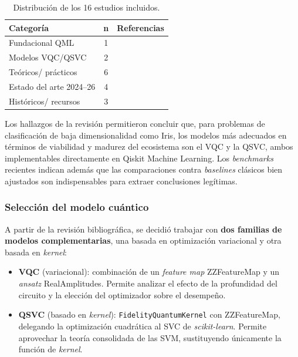 \documentclass[a4paper,10pt,twocolumn]{article}
\begin{document}
\begin{table}[H]
\centering
\caption{Distribuci\'on de los 16 estudios incluidos.}
\label{tab:prisma}
\footnotesize
\begin{tabular}{@{}p{2.6cm}c p{3.7cm}@{}}
\toprule
\textbf{Categor\'ia} & \textbf{n} & \textbf{Referencias} \\
\midrule
Fundacional QML        & 1 & \cite{biamonte2017} \\
Modelos VQC/QSVC       & 2 & \cite{havlicek2019,rebentrost2014} \\
Te\'oricos/ pr\'acticos & 6 & \cite{cerezo2021,mcclean2018,larocca2025,thanasilp2024,schuld2019,preskill2018} \\
Estado del arte 2024--26 & 4 & \cite{bowles2024,schnabel2024,yu2025,huang2021} \\
Hist\'oricos/ recursos   & 3 & \cite{fisher1936,nielsen2010,qiskit2024} \\
\bottomrule
\end{tabular}
\end{table}

\noindent Los hallazgos de la revisi\'on permitieron concluir que, para
problemas de clasificaci\'on de baja dimensionalidad como Iris, los
modelos m\'as adecuados en t\'erminos de viabilidad y madurez del
ecosistema son el VQC y la QSVC, ambos implementables directamente en
Qiskit Machine Learning. Los \textit{benchmarks} recientes
\citep{bowles2024, schnabel2024} indican adem\'as que las comparaciones
contra \textit{baselines} cl\'asicos bien ajustados son indispensables
para extraer conclusiones leg\'itimas.

\subsubsection{Selecci\'on del modelo cu\'antico}
A partir de la revisi\'on bibliogr\'afica, se decidi\'o trabajar con
\textbf{dos familias de modelos complementarias}, una basada en
optimizaci\'on variacional y otra basada en \textit{kernel}:

\begin{itemize}
    \item \textbf{VQC} (variacional): combinaci\'on de un
    \textit{feature map} ZZFeatureMap y un \textit{ansatz}
    RealAmplitudes. Permite analizar el efecto de la profundidad del
    circuito y la elecci\'on del optimizador sobre el desempe\~no.

    \item \textbf{QSVC} (basado en \textit{kernel}):
    \texttt{FidelityQuantumKernel} con ZZFeatureMap, delegando la
    optimizaci\'on cuadr\'atica al SVC de \textit{scikit-learn}. Permite
    aprovechar la teor\'ia consolidada de las SVM, sustituyendo
    \'unicamente la funci\'on de \textit{kernel}.
\end{itemize}
\end{document}
